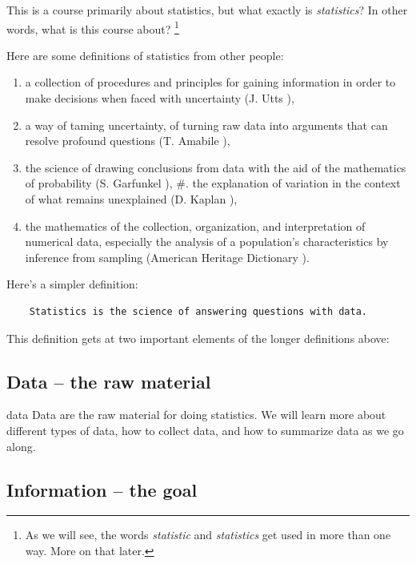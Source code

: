 \documentclass[]{book}
\let\rmarkdownfootnote\footnote%
\def\footnote{\protect\rmarkdownfootnote}
\begin{document}
This is a course primarily about statistics, but what exactly is \emph{statistics}? In other words, what is this course about? \footnote{As we will see, the words \emph{statistic} and \emph{statistics} get used in more than one way. More on that later.}

Here are some definitions of statistics from other people:

\begin{enumerate}
\item
  a collection of procedures and principles for gaining information in
  order to make decisions when faced with
  uncertainty (J. Utts \citet{Utts:2005:SeeingThroughStats}),
\item
  a way of taming uncertainty, of turning raw data into arguments that
  can resolve profound questions (T. Amabile \citet{AgainstAllOdds:video}),
\item
  the science of drawing conclusions from data with the aid of the
  mathematics of probability
  (S. Garfunkel \citet{ForAllPracticalPurposes:video}),
  \#. the explanation of variation in the context of what remains unexplained
  (D. Kaplan \citet{kaplan-modeling}),
\item
  the mathematics of the collection, organization, and interpretation of
  numerical data, especially the analysis of a population's characteristics by
  inference from sampling
  (American Heritage Dictionary \citet{AmHerDictionary:1982}).
\end{enumerate}

Here's a simpler definition:

\begin{verbatim}
    Statistics is the science of answering questions with data.
\end{verbatim}

This definition gets at two important elements of the longer definitions above:

\hypertarget{data-the-raw-material}{%
\subsection{Data -- the raw material}\label{data-the-raw-material}}

data
Data are the raw material for doing statistics. We will learn more about different types of data, how to collect data, and how to summarize data as we go along.

\hypertarget{information-the-goal}{%
\subsection{Information -- the goal}\label{information-the-goal}}
\end{document}

